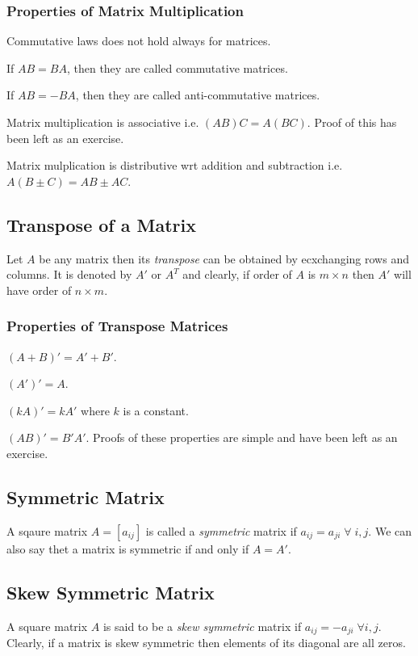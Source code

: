 \subsubsection{Properties of Matrix Multiplication}
\startitemize[n]
\item Commutative laws does not hold always for matrices.
\item If $AB = BA$, then they are called commutative matrices.
\item If $AB = -BA$, then they are called anti-commutative matrices.
\item Matrix multiplication is associative i.e. $(AB)C = A(BC)$. Proof of this has been left as an exercise.
\item Matrix mulplication is distributive wrt addition and subtraction i.e. $A(B\pm C) = AB \pm AC$.
\stopitemize

\subsection{Transpose of a Matrix}
Let $A$ be any matrix then its {\it transpose} can be obtained by ecxchanging rows and columns. It is denoted by $A'$ or $A^T$
and clearly, if order of $A$ is $m\times n$ then $A'$ will have order of $n\times m$.

\subsubsection{Properties of Transpose Matrices}
\startitemize[n]
\item $(A + B)' = A' + B'$.
\item $(A')' = A$.
\item $(kA)' = kA'$ where $k$ is a constant.
\item $(AB)' = B'A'$.
\stopitemize
Proofs of these properties are simple and have been left as an exercise.

\subsection{Symmetric Matrix}
A sqaure matrix $A = [a_{ij}]$ is called a {\it symmetric} matrix if $a_{ij} = a_{ji}\;\forall\;i,j$. We can also say thet a
matrix is symmetric if and only if $A = A'$.

\subsection{Skew Symmetric Matrix}
A square matrix $A$ is said to be a {\it skew symmetric} matrix if $a_{ij} = -a_{ji}\;\forall i, j$. Clearly, if a matrix is skew
symmetric then elements of its diagonal are all zeros.

